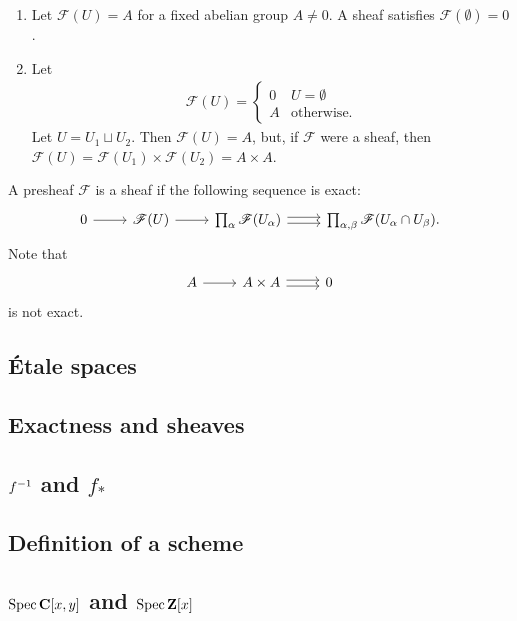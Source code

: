 \documentclass [11 pt, oneside, margin = 1 in] {article}
\begin{document}
\begin{example}\label{}\text{}
\begin{enumerate}
	\item Let $\mathscr{F}(U) = A$ for a fixed abelian group $A\ne 0$. A sheaf satisfies $\mathscr{F}(\emptyset) = 0$.
	\item Let
		\begin{align*}
			\mathscr{F}(U) = 
			 \begin{cases}
				 0&U=\emptyset\\
				 A&\textrm{otherwise.}
			\end{cases}
		\end{align*}
		Let $U = U_1\sqcup U_2$. Then $\mathscr{F}(U) =A$, but, if $\mathscr{F}$ were a sheaf, then $\mathscr{F}(U) =  \mathscr{F}(U_1)\times \mathscr{F}(U_2) = A\times A$.
\end{enumerate}

A presheaf $\mathscr{F}$ is a sheaf if the following sequence is exact:
\[
\begin{tikzcd}
	\displaystyle 0 \ar[r] & \mathscr{F}(U) \ar[r] & \prod_\alpha  \mathscr{F}(U_\alpha) \ar[r, yshift = 0.5 ex] \ar[r, yshift = -0.5 ex] & \prod_{\alpha,\beta}  \mathscr{F}(U_\alpha\cap U_\beta).
\end{tikzcd}
\]
Note that 
\[
\begin{tikzcd}
	A\ar[r] &A\times A \ar[r, yshift = 0.5 ex] \ar[r, yshift = -0.5 ex] & 0 
\end{tikzcd}
\]
is not exact.
\end{example}

\subsection{\'Etale spaces}
\subsection{Exactness and sheaves}
\subsection{$f^{-1}$ and $f_*$}
\subsection{Definition of a scheme}
\subsection{$\operatorname{Spec} \mathbf C[x,y]$ and $\operatorname{Spec} \mathbf Z[x]$}
\end{document}
